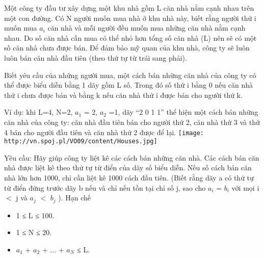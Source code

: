 Một công ty đầu tư xây dựng một khu nhà gồm L căn nhà nằm cạnh nhau trên một con đường. Có N người muốn mua nhà ở khu nhà này, biết rằng người thứ i muốn mua $a_{i}$        căn nhà và mỗi người đều muốn mua những căn nhà nằm cạnh nhau. Do số căn nhà cần mua có thể nhỏ hơn tổng số căn nhà (L) nên sẽ có một số căn nhà chưa được bán. Để đảm bảo mỹ quan của khu nhà, công ty sẽ luôn luôn bán căn nhà đầu tiên (theo thứ tự từ trái sang phải).       

        Biết yêu cầu của những người mua, một cách bán những căn nhà của công ty có thể được biểu diễn bằng 1 dãy gồm L số. Trong đó số thứ i bằng 0 nếu căn nhà thứ i chưa được bán và bằng k nếu căn nhà thứ i được bán cho người thứ k.       

        Ví dụ: khi L=4, N=2, $a_{1}$        = 2, $a_{2}$        =1, dãy “2 0 1 1” thể hiện một cách bán những căn nhà của công ty: căn nhà đầu tiên bán cho người thứ 2, căn nhà thứ 3 và thứ 4 bán cho người đầu tiên và căn nhà thứ 2 được để lại.       
\texttt{[image: http://vn.spoj.pl/VO09/content/Houses.jpg]}



   Yêu cầu: Hãy giúp công ty liệt kê các cách bán những căn nhà. Các cách bán căn nhà được liệt kê theo thứ tự từ điển của dãy số biểu diễn. Nếu số cách bán căn nhà lớn hơn 1000, chỉ cần liệt kê 1000 cách đầu tiên. (Biết rằng dãy a có thứ tự từ điển đứng trước dãy b nếu và chỉ nếu tồn tại chỉ số j, sao cho $a_{i}$   = $b_{i}$   với mọi i $<$ j và $a_{j}$   $<$ $b_{j}$   ).
   Hạn chế  
\begin{itemize}
	\item     1 ≤ L ≤ 100.   
	\item     1 ≤ N ≤ 20.   
	\item     $a_{1}$    + $a_{2}$    + ... + $a_{N}$    ≤ L.   
\end{itemize}